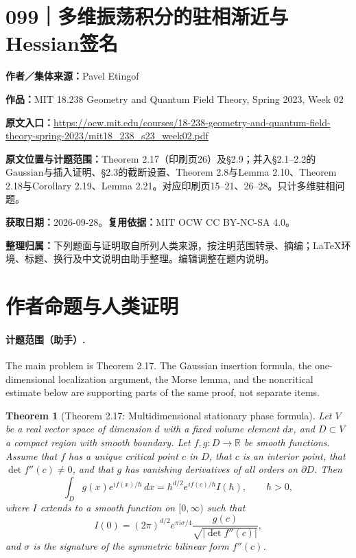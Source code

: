 \documentclass[UTF8,11pt,a4paper]{ctexart}
\newtheorem*{theorem}{Theorem}
\theoremstyle{definition}\newtheorem*{definition}{Definition}
\theoremstyle{remark}\newtheorem*{remark}{Remark}
\newcommand{\R}{\mathbb R}
\begin{document}
\section*{099｜多维振荡积分的驻相渐近与Hessian签名}
\textbf{作者／集体来源：}Pavel Etingof

\textbf{作品：}MIT 18.238 Geometry and Quantum Field Theory, Spring 2023, Week 02

\textbf{原文入口：}\url{https://ocw.mit.edu/courses/18-238-geometry-and-quantum-field-theory-spring-2023/mit18_238_s23_week02.pdf}

\textbf{原文位置与计题范围：}Theorem 2.17（印刷页26）及§2.9；并入§2.1--2.2的Gaussian与插入证明、§2.3的截断设置、Theorem 2.8与Lemma 2.10、Theorem 2.18与Corollary 2.19、Lemma 2.21。对应印刷页15--21、26--28。只计多维驻相问题。

\textbf{获取日期：}2026-09-28。\quad\textbf{复用依据：}MIT OCW CC BY-NC-SA 4.0。

\textbf{整理归属：}下列题面与证明取自所列人类来源，按注明范围转录、摘编；LaTeX环境、标题、换行及中文说明由助手整理。编辑调整在题内说明。

\section*{作者命题与人类证明}

\paragraph{计题范围（助手）.} The main problem is Theorem 2.17. The Gaussian insertion formula, the one-dimensional localization argument, the Morse lemma, and the noncritical estimate below are supporting parts of the same proof, not separate items.

\begin{theorem}[Theorem 2.17: Multidimensional stationary phase formula]
Let $V$ be a real vector space of dimension $d$ with a fixed volume element $dx$, and $D\subset V$ a compact region with smooth boundary. Let $f,g:D\to\R$ be smooth functions. Assume that $f$ has a unique critical point $c$ in $D$, that $c$ is an interior point, that $\det f''(c)\ne0$, and that $g$ has vanishing derivatives of all orders on $\partial D$. Then
\[
\int_D g(x)e^{if(x)/\hbar}\,dx
=\hbar^{d/2}e^{if(c)/\hbar}I(\hbar),\qquad \hbar>0,
\]
where $I$ extends to a smooth function on $[0,\infty)$ such that
\[
I(0)=(2\pi)^{d/2}e^{\pi i\sigma/4}
\frac{g(c)}{\sqrt{|\det f''(c)|}},
\]
and $\sigma$ is the signature of the symmetric bilinear form $f''(c)$.
\end{theorem}
\end{document}
